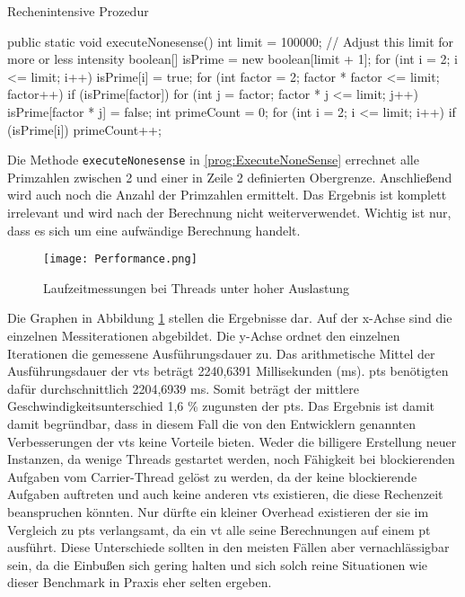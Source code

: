     \begin{program} [H]
        \caption{Rechenintensive Prozedur}
        \label{prog:ExecuteNoneSense}
    \begin{JavaCode}[language=Java, numbers=left]
public static void executeNonesense() {
    int limit = 100000; // Adjust this limit for more or less intensity
    boolean[] isPrime = new boolean[limit + 1];
    for (int i = 2; i <= limit; i++) 
        isPrime[i] = true;
    for (int factor = 2; factor * factor <= limit; factor++) {
        if (isPrime[factor]) {
            for (int j = factor; factor * j <= limit; j++) 
                isPrime[factor * j] = false;
        }
    }
    int primeCount = 0;
    for (int i = 2; i <= limit; i++) {
        if (isPrime[i])
            primeCount++;
    }
}\end{JavaCode}
    \end{program}

    Die Methode \texttt{executeNonesense} in \ref{prog:ExecuteNoneSense} errechnet alle Primzahlen zwischen 2 und einer in Zeile 2 definierten Obergrenze. Anschließend wird 
    auch noch die Anzahl der Primzahlen ermittelt. Das Ergebnis ist komplett irrelevant und wird nach der Berechnung nicht weiterverwendet. Wichtig ist nur, dass es sich um
    eine aufwändige Berechnung handelt.

    \begin{figure}[H]
        \centering
        \texttt{[image: Performance.png]}
        \caption{Laufzeitmessungen bei Threads unter hoher Auslastung}
        \label{fig:Performance}
    \end{figure}

    Die Graphen in Abbildung \ref{fig:Performance} stellen die Ergebnisse dar. Auf der x-Achse sind die einzelnen Messiterationen abgebildet. Die y-Achse ordnet den einzelnen Iterationen die gemessene
    Ausführungsdauer zu.
    Das arithmetische Mittel der Ausführungsdauer der \Glspl{vt} beträgt 2240,6391 Millisekunden (ms). 
    \Glspl{pt} benötigten dafür durchschnittlich 2204,6939 ms. Somit beträgt der mittlere Geschwindigkeitsunterschied 1,6 \% zugunsten der \Glspl{pt}.
    Das Ergebnis ist damit damit begründbar, dass in diesem Fall die von den Entwicklern genannten Verbesserungen der \Glspl{vt} keine Vorteile bieten. Weder die billigere
    Erstellung neuer Instanzen, da wenige Threads gestartet werden, noch Fähigkeit bei blockierenden Aufgaben vom Carrier-Thread gelöst zu werden, da der keine blockierende Aufgaben auftreten und
    auch keine anderen \Glspl{vt} existieren, die diese Rechenzeit beanspruchen könnten. Nur dürfte ein kleiner Overhead existieren der sie im Vergleich zu \Glspl{pt} verlangsamt, da ein \gls{vt} alle seine
    Berechnungen auf einem \gls{pt} ausführt.
    Diese Unterschiede sollten in den meisten Fällen aber vernachlässigbar sein, da die Einbußen sich gering halten und sich solch reine Situationen wie dieser Benchmark in Praxis eher selten 
    ergeben.



